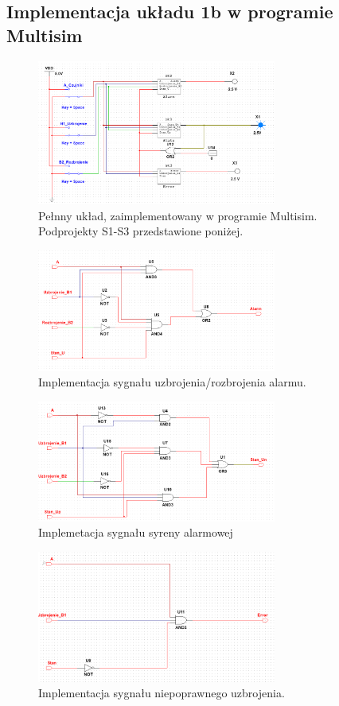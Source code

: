 \documentclass{article}
\begin{document}
\subsection{Implementacja układu 1b w programie Multisim}
\begin{figure}[H]
\includegraphics[width=0.7\textwidth]{fullMS}
\caption{Pełnny układ, zaimplementowany w programie Multisim. Podprojekty S1-S3 przedstawione poniżej.}
\end{figure}
\begin{figure}[H]
\includegraphics[width=0.7\textwidth]{alarmMS}
\caption{Implementacja sygnału uzbrojenia/rozbrojenia alarmu.}
\end{figure}
\begin{figure}[H]
\includegraphics[width=0.7\textwidth]{syrenaMS}
\caption{Implemetacja sygnału syreny alarmowej}
\end{figure}
\begin{figure}[H]
\includegraphics[width=0.7\textwidth]{errorMS}
\caption{Implementacja sygnału niepoprawnego uzbrojenia.}
\end{figure}
\end{document}
